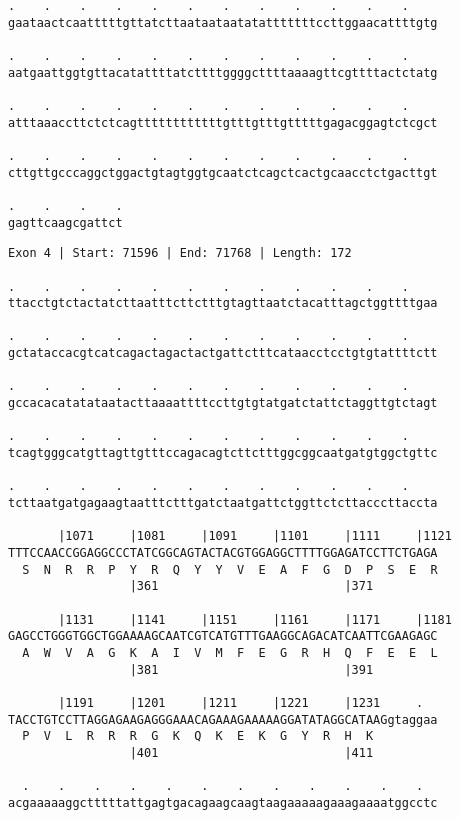 \documentclass{article}
\begin{document}
\begin{Verbatim}
.    .    .    .    .    .    .    .    .    .    .    .    
gaataactcaatttttgttatcttaataataatatatttttttccttggaacattttgtg
  
.    .    .    .    .    .    .    .    .    .    .    .    
aatgaattggtgttacatattttatcttttggggcttttaaaagttcgttttactctatg
  
.    .    .    .    .    .    .    .    .    .    .    .    
atttaaaccttctctcagttttttttttttgtttgtttgtttttgagacggagtctcgct
  
.    .    .    .    .    .    .    .    .    .    .    .    
cttgttgcccaggctggactgtagtggtgcaatctcagctcactgcaacctctgacttgt
  
.    .    .    .
gagttcaagcgattct
\end{Verbatim}
\newpage
\begin{Verbatim}
Exon 4 | Start: 71596 | End: 71768 | Length: 172
 
.    .    .    .    .    .    .    .    .    .    .    .    
ttacctgtctactatcttaatttcttctttgtagttaatctacatttagctggttttgaa
  
.    .    .    .    .    .    .    .    .    .    .    .    
gctataccacgtcatcagactagactactgattctttcataacctcctgtgtattttctt
  
.    .    .    .    .    .    .    .    .    .    .    .    
gccacacatatataatacttaaaattttccttgtgtatgatctattctaggttgtctagt
  
.    .    .    .    .    .    .    .    .    .    .    .    
tcagtgggcatgttagttgtttccagacagtcttctttggcggcaatgatgtggctgttc
  
.    .    .    .    .    .    .    .    .    .    .    .    
tcttaatgatgagaagtaatttctttgatctaatgattctggttctcttacccttaccta
  
       |1071     |1081     |1091     |1101     |1111     |1121
TTTCCAACCGGAGGCCCTATCGGCAGTACTACGTGGAGGCTTTTGGAGATCCTTCTGAGA
  S  N  R  R  P  Y  R  Q  Y  Y  V  E  A  F  G  D  P  S  E  R
                 |361                          |371         
  
       |1131     |1141     |1151     |1161     |1171     |1181
GAGCCTGGGTGGCTGGAAAAGCAATCGTCATGTTTGAAGGCAGACATCAATTCGAAGAGC
  A  W  V  A  G  K  A  I  V  M  F  E  G  R  H  Q  F  E  E  L
                 |381                          |391         
  
       |1191     |1201     |1211     |1221     |1231     .  
TACCTGTCCTTAGGAGAAGAGGGAAACAGAAAGAAAAAGGATATAGGCATAAGgtaggaa
  P  V  L  R  R  R  G  K  Q  K  E  K  G  Y  R  H  K         
                 |401                          |411         
  
  .    .    .    .    .    .    .    .    .    .    .    .  
acgaaaaaggctttttattgagtgacagaagcaagtaagaaaaagaaagaaaatggcctc
  

\end{Verbatim}
\end{document}
